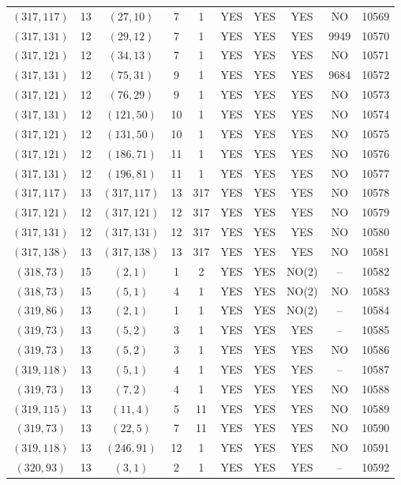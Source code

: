 \begin{longtable}{|c|c|c|c|c|c|c|c|c|c|}
$(317, 117)$ & 13 & $(27, 10)$ & 7 & 1 & YES & YES & YES & NO & 10569\\
$(317, 131)$ & 12 & $(29, 12)$ & 7 & 1 & YES & YES & YES & 9949 & 10570\\
$(317, 121)$ & 12 & $(34, 13)$ & 7 & 1 & YES & YES & YES & NO & 10571\\
$(317, 131)$ & 12 & $(75, 31)$ & 9 & 1 & YES & YES & YES & 9684 & 10572\\
$(317, 121)$ & 12 & $(76, 29)$ & 9 & 1 & YES & YES & YES & NO & 10573\\
$(317, 131)$ & 12 & $(121, 50)$ & 10 & 1 & YES & YES & YES & NO & 10574\\
$(317, 121)$ & 12 & $(131, 50)$ & 10 & 1 & YES & YES & YES & NO & 10575\\
$(317, 121)$ & 12 & $(186, 71)$ & 11 & 1 & YES & YES & YES & NO & 10576\\
$(317, 131)$ & 12 & $(196, 81)$ & 11 & 1 & YES & YES & YES & NO & 10577\\
$(317, 117)$ & 13 & $(317, 117)$ & 13 & 317 & YES & YES & YES & NO & 10578\\
$(317, 121)$ & 12 & $(317, 121)$ & 12 & 317 & YES & YES & YES & NO & 10579\\
$(317, 131)$ & 12 & $(317, 131)$ & 12 & 317 & YES & YES & YES & NO & 10580\\
$(317, 138)$ & 13 & $(317, 138)$ & 13 & 317 & YES & YES & YES & NO & 10581\\
$(318, 73)$ & 15 & $(2, 1)$ & 1 & 2 & YES & YES & NO(2) & -- & 10582\\
$(318, 73)$ & 15 & $(5, 1)$ & 4 & 1 & YES & YES & NO(2) & NO & 10583\\
$(319, 86)$ & 13 & $(2, 1)$ & 1 & 1 & YES & YES & NO(2) & -- & 10584\\
$(319, 73)$ & 13 & $(5, 2)$ & 3 & 1 & YES & YES & YES & -- & 10585\\
$(319, 73)$ & 13 & $(5, 2)$ & 3 & 1 & YES & YES & YES & NO & 10586\\
$(319, 118)$ & 13 & $(5, 1)$ & 4 & 1 & YES & YES & YES & -- & 10587\\
$(319, 73)$ & 13 & $(7, 2)$ & 4 & 1 & YES & YES & YES & NO & 10588\\
$(319, 115)$ & 13 & $(11, 4)$ & 5 & 11 & YES & YES & YES & NO & 10589\\
$(319, 73)$ & 13 & $(22, 5)$ & 7 & 11 & YES & YES & YES & NO & 10590\\
$(319, 118)$ & 13 & $(246, 91)$ & 12 & 1 & YES & YES & YES & NO & 10591\\
$(320, 93)$ & 13 & $(3, 1)$ & 2 & 1 & YES & YES & YES & -- & 10592\\

\end{longtable}
